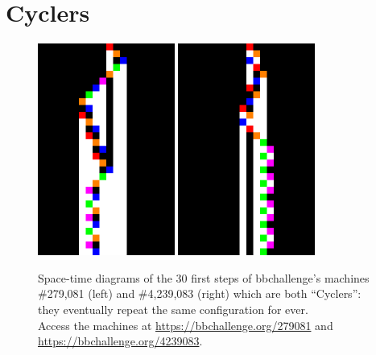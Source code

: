
\section{Cyclers}\label{sec:cyclers}

\begin{figure}[h!]
  \centering
  \includegraphics[width=0.4\textwidth]{figures/space-time-diagrams/cycler_279081.pdf}
  \hspace{2ex}
  \includegraphics[width=0.4\textwidth]{figures/space-time-diagrams/cycler_4239083.pdf}
  \caption{Space-time diagrams of the 30 first steps of bbchallenge's machines \#279,081 (left) and \#4,239,083 (right) which are both ``Cyclers'': they eventually repeat the same configuration for ever. \\
    Access the machines at \url{https://bbchallenge.org/279081} and
    \url{https://bbchallenge.org/4239083}.}\label{fig:cyclers}
\end{figure}

